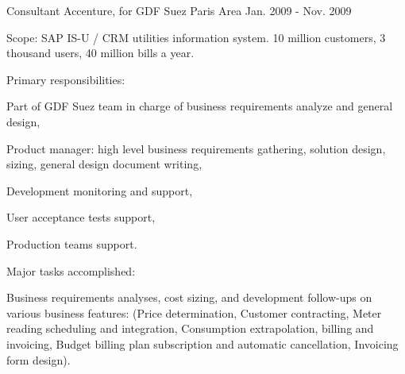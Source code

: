 \begin{cventries}
  \cventry
    {Consultant} %
    {Accenture, for GDF Suez} %
    {Paris Area} %
    {Jan. 2009 - Nov. 2009} %
    {
      \begin{cvitems} %
        \item {Scope: SAP IS-U / CRM utilities information system. 10 million customers, 3 thousand users, 40 million bills a year.}
        \item {Primary responsibilities:}
        \begin{cvsubitems}
          \item {Part of GDF Suez team in charge of business requirements analyze and general design,}
          \item {Product manager: high level business requirements gathering, solution design, sizing, general design document writing,}
          \item {Development monitoring and support,}
          \item {User acceptance tests support,}
          \item {Production teams support.}
        \end{cvsubitems}
        \item {Major tasks accomplished:}
        \begin{cvsubitems}
          \item {Business requirements analyses, cost sizing, and development follow-ups on various business features: (Price determination, Customer contracting, Meter reading scheduling and integration, Consumption extrapolation, billing and invoicing, Budget billing plan subscription and automatic cancellation, Invoicing form design).}
        \end{cvsubitems}
      \end{cvitems}
    }


\end{cventries}
